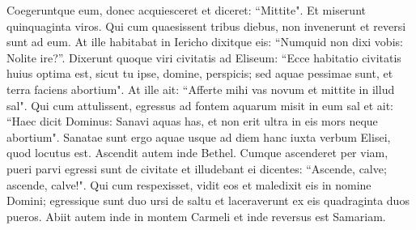 \begin{biblechapter}
\verse Coegeruntque eum, donec acquiesceret et diceret: “Mittite". Et miserunt quinquaginta viros. Qui cum quaesissent tribus diebus, non invenerunt 
\verse et reversi sunt ad eum. At ille habitabat in Iericho dixitque eis: “Numquid non dixi vobis: Nolite ire?”. 
\verse Dixerunt quoque viri civitatis ad Eliseum: “Ecce habitatio civitatis huius optima est, sicut tu ipse, domine, perspicis; sed aquae pessimae sunt, et terra faciens abortium". 
\verse At ille ait: “Afferte mihi vas novum et mittite in illud sal". Qui cum attulissent, 
\verse egressus ad fontem aquarum misit in eum sal et ait: “Haec dicit Dominus: Sanavi aquas has, et non erit ultra in eis mors neque abortium". 
\verse Sanatae sunt ergo aquae usque ad diem hanc iuxta verbum Elisei, quod locutus est. 
\verse Ascendit autem inde Bethel. Cumque ascenderet per viam, pueri parvi egressi sunt de civitate et illudebant ei dicentes: “Ascende, calve; ascende, calve!".  
\verse Qui cum respexisset, vidit eos et maledixit eis in nomine Domini; egressique sunt duo ursi de saltu et laceraverunt ex eis quadraginta duos pueros. 
\verse Abiit autem inde in montem Carmeli et inde reversus est Samariam. 
\end{biblechapter}

